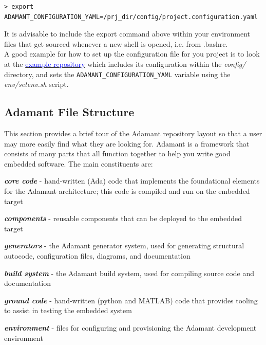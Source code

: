 \vspace{5mm} %
\begin{verbatim}
> export ADAMANT_CONFIGURATION_YAML=/prj_dir/config/project.configuration.yaml
\end{verbatim}
\vspace{5mm} %

It is advisable to include the export command above within your environment files that get sourced whenever a new shell is opened, i.e. from .bashrc. \\

A good example for how to set up the configuration file for you project is to look at the \href{https://github.com/lasp/adamant_example/tree/main}{\textcolor{blue}{example repository}} which includes its configuration within the \textit{config/} directory, and sets the \texttt{ADAMANT\_CONFIGURATION\_YAML} variable using the \textit{env/setenv.sh} script.

\subsection{Adamant File Structure}

This section provides a brief tour of the Adamant repository layout so that a user may more easily find what they are looking for. Adamant is a framework that consists of many parts that all function together to help you write good embedded software. The main constituents are:

\vspace{5mm} %
\begin{spaceditemize}
  \item \textbf{\textit{core code}} - hand-written (Ada) code that implements the foundational elements for the Adamant architecture; this code is compiled and run on the embedded target
  \item \textbf{\textit{components}} - reusable components that can be deployed to the embedded target
  \item \textbf{\textit{generators}} - the Adamant generator system, used for generating structural autocode, configuration files, diagrams, and documentation 
  \item \textbf{\textit{build system}} - the Adamant build system, used for compiling source code and documentation
  \item \textbf{\textit{ground code}} - hand-written (python and MATLAB) code that provides tooling to assist in testing the embedded system
  \item \textbf{\textit{environment}} - files for configuring and provisioning the Adamant development environment
\end{spaceditemize}
\vspace{5mm} %

